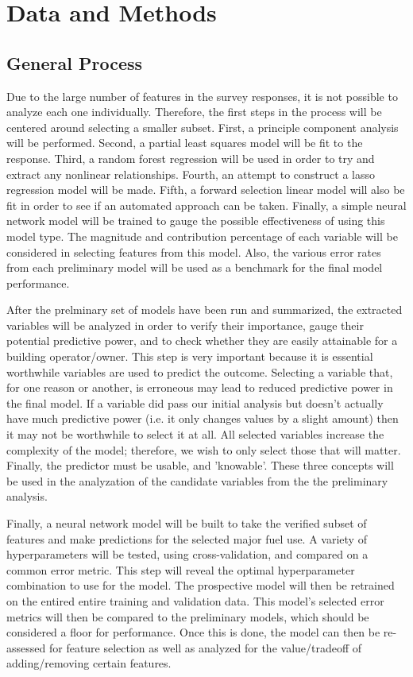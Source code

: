 \section{Data and Methods}
\subsection{General Process}

Due to the large number of features in the survey responses, it is not possible to analyze each one individually.  Therefore, the first steps in the process will be centered around selecting a smaller subset.  First, a principle component analysis will be performed.  Second, a partial least squares model will be fit to the response.  Third, a random forest regression will be used in order to try and extract any nonlinear relationships.  Fourth, an attempt to construct a lasso regression model will be made.  Fifth, a forward selection linear model will also be fit in order to see if an automated approach can be taken.  Finally, a simple neural network model will be trained to gauge the possible effectiveness of using this model type.  The magnitude and contribution percentage of each variable will be considered in selecting features from this model.  Also, the various error rates from each preliminary model will be used as a benchmark for the final model performance.

After the prelminary set of models have been run and summarized, the extracted variables will be analyzed in order to verify their importance, gauge their potential predictive power, and to check whether they are easily attainable for a building operator/owner.  This step is very important because it is essential worthwhile variables are used to predict the outcome.  Selecting a variable that, for one reason or another, is erroneous may lead to reduced predictive power in the final model.  If a variable did pass our initial analysis but doesn't actually have much predictive power (i.e. it only changes values by a slight amount) then it may not be worthwhile to select it at all.  All selected variables increase the complexity of the model; therefore, we wish to only select those that will matter.  Finally, the predictor must be usable, and 'knowable'.  These three concepts will be used in the analyzation of the candidate variables from the the preliminary analysis. 

Finally, a neural network model will be built to take the verified subset of features and make predictions for the selected major fuel use.  A variety of hyperparameters will be tested, using cross-validation, and compared on a common error metric.  This step will reveal the optimal hyperparameter combination to use for the model.  The prospective model will then be retrained on the entired entire training and validation data.  This model's selected error metrics will then be compared to the preliminary models, which should be considered a floor for performance.  Once this is done, the model can then be re-assessed for feature selection as well as analyzed for the value/tradeoff of adding/removing certain features.  

